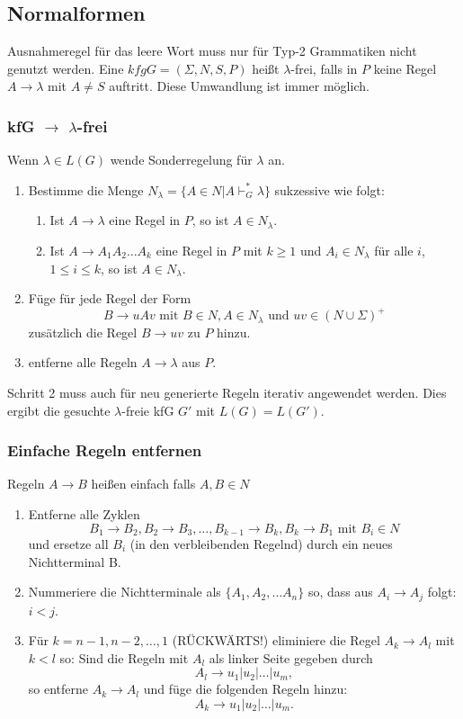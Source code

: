 \documentclass[9pt]{article}
\begin{document}
\subsection{Normalformen}
Ausnahmeregel für das leere Wort muss nur für Typ-2 Grammatiken nicht genutzt werden. Eine $kfg G = (\Sigma, N, S, P)$ heißt $\lambda$-frei, falls in $P$ keine Regel $A \to \lambda$ mit $A \neq S$ auftritt. Diese Umwandlung ist immer möglich.
\subsubsection{kfG $\to$ $\lambda$-frei}
Wenn $\lambda \in L(G)$ wende Sonderregelung für $\lambda$ an.
\begin{enumerate}
	\item Bestimme die Menge $N_\lambda=\{A \in N | A \vdash^*_G \lambda\}$ sukzessive wie folgt:
	\begin{enumerate}
		\item Ist $A \to \lambda$ eine Regel in $P$, so ist $A \in N_\lambda$.
		\item Ist $ A \to A_1 A_2 \dots A_k $ eine Regel in $P$ mit $k \geq 1$ und $A_i \in N_\lambda$ für alle $i$, $1 \leq i \leq k$, so ist $A \in N_\lambda$.
	\end{enumerate}
	\item Füge für jede Regel der Form
	$$B \to uAv \text{ mit } B \in N, A\in N_\lambda \text{ und } uv \in (N \cup \Sigma)^+$$
	zusätzlich die Regel $B \to uv$ zu $P$ hinzu.
	\item entferne alle Regeln $A \to \lambda$ aus $P$.
\end{enumerate}
Schritt 2 muss auch für neu generierte Regeln iterativ angewendet werden. Dies ergibt die gesuchte $\lambda$-freie kfG $G'$ mit $L(G) =L(G')$.
\subsubsection{Einfache Regeln entfernen}
Regeln $A \to B$ heißen einfach falls $A, B \in N$
\begin{enumerate}
	\item Entferne alle Zyklen
	$$B_1 \to B_2, B_2\to B_3, \dots , B_{k-1} \to B_k, B_k \to B_1 \text{ mit } B_i \in N$$
	und ersetze all $B_i$ (in den verbleibenden Regelnd) durch ein neues Nichtterminal B.
	\item Nummeriere die Nichtterminale als $\{A_1, A_2, \dots A_n\}$ so, dass aus $A_i \to A_j$ folgt: $i < j$.
	\item Für $k = n - 1, n - 2, \dots , 1$ (RÜCKWÄRTS!) eliminiere die Regel $A_k \to A_l$ mit $k < l$ so: Sind die Regeln mit $A_l$ als linker Seite gegeben durch
	$$A_l \to u_1 | u_2 | \dots | u_m,$$
	so entferne $A_k \to A_l$ und füge die folgenden Regeln hinzu:
	$$A_k \to u_1 | u_2 | \dots | u_m.$$
\end{enumerate}
\end{document}
